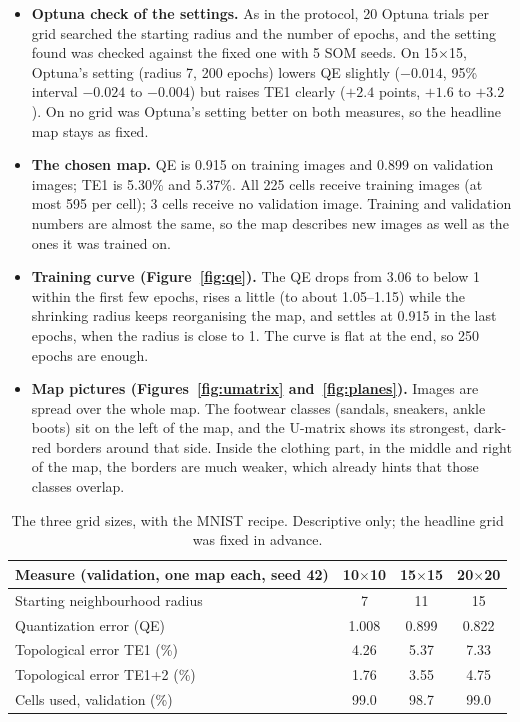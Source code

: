 \documentclass[11pt]{article}
\begin{document}
\begin{itemize}[leftmargin=1.4em, itemsep=2pt]
\item \textbf{Optuna check of the settings.} As in the protocol, 20 Optuna trials per grid searched the starting radius and the number of epochs, and the setting found was checked against the fixed one with 5 SOM seeds. On 15$\times$15, Optuna's setting (radius 7, 200 epochs) lowers QE slightly ($-0.014$, 95\% interval $-0.024$ to $-0.004$) but raises TE1 clearly ($+2.4$ points, $+1.6$ to $+3.2$). On no grid was Optuna's setting better on both measures, so the headline map stays as fixed.

\item \textbf{The chosen map.} QE is 0.915 on training images and 0.899 on validation images; TE1 is 5.30\% and 5.37\%. All 225 cells receive training images (at most 595 per cell); 3 cells receive no validation image. Training and validation numbers are almost the same, so the map describes new images as well as the ones it was trained on.

\item \textbf{Training curve (Figure~\ref{fig:qe}).} The QE drops from 3.06 to below 1 within the first few epochs, rises a little (to about 1.05--1.15) while the shrinking radius keeps reorganising the map, and settles at 0.915 in the last epochs, when the radius is close to 1. The curve is flat at the end, so 250 epochs are enough.

\item \textbf{Map pictures (Figures~\ref{fig:umatrix} and~\ref{fig:planes}).} Images are spread over the whole map. The footwear classes (sandals, sneakers, ankle boots) sit on the left of the map, and the U-matrix shows its strongest, dark-red borders around that side. Inside the clothing part, in the middle and right of the map, the borders are much weaker, which already hints that those classes overlap.
\end{itemize}

\begin{table}[H]
\centering
\renewcommand{\arraystretch}{1.12}
\small
\begin{tabular}{|l|c|c|c|}
\hline
\textbf{Measure (validation, one map each, seed 42)} & \textbf{10$\times$10} & \textbf{15$\times$15} & \textbf{20$\times$20} \\ \hline
Starting neighbourhood radius & 7 & 11 & 15 \\ \hline
Quantization error (QE) & 1.008 & 0.899 & 0.822 \\ \hline
Topological error TE1 (\%) & 4.26 & 5.37 & 7.33 \\ \hline
Topological error TE1+2 (\%) & 1.76 & 3.55 & 4.75 \\ \hline
Cells used, validation (\%) & 99.0 & 98.7 & 99.0 \\ \hline
\end{tabular}
\caption{The three grid sizes, with the MNIST recipe. Descriptive only; the headline grid was fixed in advance.}
\label{tab:grids}
\end{table}
\end{document}
